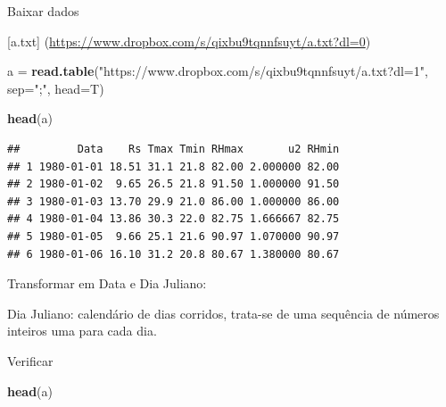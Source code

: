\documentclass[
]{book}
\newenvironment{Shaded}{\begin{snugshade}}{\end{snugshade}}
\newcommand{\DataTypeTok}[1]{\textcolor[rgb]{0.13,0.29,0.53}{#1}}
\newcommand{\KeywordTok}[1]{\textcolor[rgb]{0.13,0.29,0.53}{\textbf{#1}}}
\newcommand{\NormalTok}[1]{#1}
\newcommand{\OperatorTok}[1]{\textcolor[rgb]{0.81,0.36,0.00}{\textbf{#1}}}
\newcommand{\StringTok}[1]{\textcolor[rgb]{0.31,0.60,0.02}{#1}}
\begin{document}
Baixar dados

{[}a.txt{]} (\url{https://www.dropbox.com/s/qixbu9tqnnfsuyt/a.txt?dl=0})

\begin{Shaded}
\begin{Highlighting}[]
\NormalTok{ a =}\StringTok{ }\KeywordTok{read.table}\NormalTok{(}\StringTok{"https://www.dropbox.com/s/qixbu9tqnnfsuyt/a.txt?dl=1"}\NormalTok{, }\DataTypeTok{sep=}\StringTok{";"}\NormalTok{, }\DataTypeTok{head=}\NormalTok{T)}
  
\KeywordTok{head}\NormalTok{(a)}
\end{Highlighting}
\end{Shaded}

\begin{verbatim}
##         Data    Rs Tmax Tmin RHmax       u2 RHmin
## 1 1980-01-01 18.51 31.1 21.8 82.00 2.000000 82.00
## 2 1980-01-02  9.65 26.5 21.8 91.50 1.000000 91.50
## 3 1980-01-03 13.70 29.9 21.0 86.00 1.000000 86.00
## 4 1980-01-04 13.86 30.3 22.0 82.75 1.666667 82.75
## 5 1980-01-05  9.66 25.1 21.6 90.97 1.070000 90.97
## 6 1980-01-06 16.10 31.2 20.8 80.67 1.380000 80.67
\end{verbatim}

Transformar em Data e Dia Juliano:

\begin{Shaded}
\end{Shaded}

Dia Juliano: calendário de dias corridos, trata-se de uma sequência de números inteiros uma para cada dia.

\begin{Shaded}
\end{Shaded}

Verificar

\begin{Shaded}
\begin{Highlighting}[]
\KeywordTok{head}\NormalTok{(a)}
\end{Highlighting}
\end{Shaded}
\end{document}
